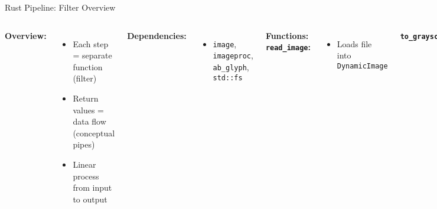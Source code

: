 \documentclass[aspectratio=169, table]{beamer}
\begin{document}
\begin{frame}[fragile]{Rust Pipeline: Filter Overview}
	\vspace{20pt}
	\begin{columns}[T]
		\textbf{Overview:}
		\begin{itemize}
			\item Each step = separate function (filter)
			\item Return values = data flow (conceptual pipes)
			\item Linear process from input to output
		\end{itemize}
		
		\textbf{Dependencies:}
		\begin{itemize}
			\item \texttt{image}, \texttt{imageproc}, \texttt{ab\_glyph}, \texttt{std::fs}
		\end{itemize}
		
		\textbf{Functions:} \\
		\textbf{\texttt{read\_image}:}
		\begin{itemize}
			\item Loads file into \texttt{DynamicImage}
		\end{itemize}
		
	
		
		
		\textbf{\texttt{to\_grayscale}:}
		\begin{itemize}
			\item Converts image to grayscale
		\end{itemize}
	
		\textbf{\texttt{resize}:}
		\begin{itemize}
			\item Scales image to 300x300 using \texttt{Lanczos3}
		\end{itemize}
		
		\textbf{\texttt{add\_watermark}:}
		\begin{itemize}
			\item Adds red text at (10,10)
			\item Loads font via \texttt{fs::read}
		\end{itemize}
		
		\textbf{\texttt{save\_image}:}
		\begin{itemize}
			\item Converts to RGB and saves as JPEG
		\end{itemize}
	\end{columns}
\end{frame}
\end{document}
